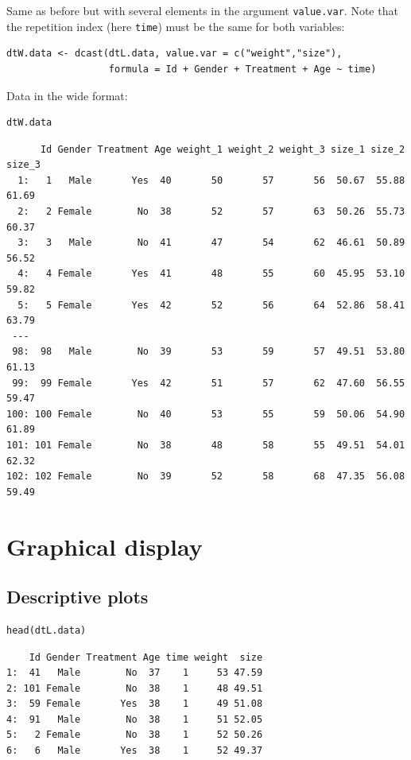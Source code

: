 \documentclass{article}
\begin{document}
Same as before but with several elements in the argument
\texttt{value.var}. Note that the repetition index (here \texttt{time}) must be the
same for both variables:
\lstset{language=r,label= ,caption= ,captionpos=b,numbers=none}
\begin{lstlisting}
dtW.data <- dcast(dtL.data, value.var = c("weight","size"),
				  formula = Id + Gender + Treatment + Age ~ time)
\end{lstlisting}

Data in the wide format:
\lstset{language=r,label= ,caption= ,captionpos=b,numbers=none}
\begin{lstlisting}
dtW.data
\end{lstlisting}

\begin{verbatim}
      Id Gender Treatment Age weight_1 weight_2 weight_3 size_1 size_2 size_3
  1:   1   Male       Yes  40       50       57       56  50.67  55.88  61.69
  2:   2 Female        No  38       52       57       63  50.26  55.73  60.37
  3:   3   Male        No  41       47       54       62  46.61  50.89  56.52
  4:   4 Female       Yes  41       48       55       60  45.95  53.10  59.82
  5:   5 Female       Yes  42       52       56       64  52.86  58.41  63.79
 ---                                                                         
 98:  98   Male        No  39       53       59       57  49.51  53.80  61.13
 99:  99 Female       Yes  42       51       57       62  47.60  56.55  59.47
100: 100 Female        No  40       53       55       59  50.06  54.90  61.89
101: 101 Female        No  38       48       58       55  49.51  54.01  62.32
102: 102 Female        No  39       52       58       68  47.35  56.08  59.49
\end{verbatim}

\section{Graphical display}
\label{sec:org85db99e}
\subsection{Descriptive plots}
\label{sec:orga899c46}

\lstset{language=r,label= ,caption= ,captionpos=b,numbers=none}
\begin{lstlisting}
head(dtL.data)
\end{lstlisting}

\begin{verbatim}
    Id Gender Treatment Age time weight  size
1:  41   Male        No  37    1     53 47.59
2: 101 Female        No  38    1     48 49.51
3:  59 Female       Yes  38    1     49 51.08
4:  91   Male        No  38    1     51 52.05
5:   2 Female        No  38    1     52 50.26
6:   6   Male       Yes  38    1     52 49.37
\end{verbatim}
\end{document}
